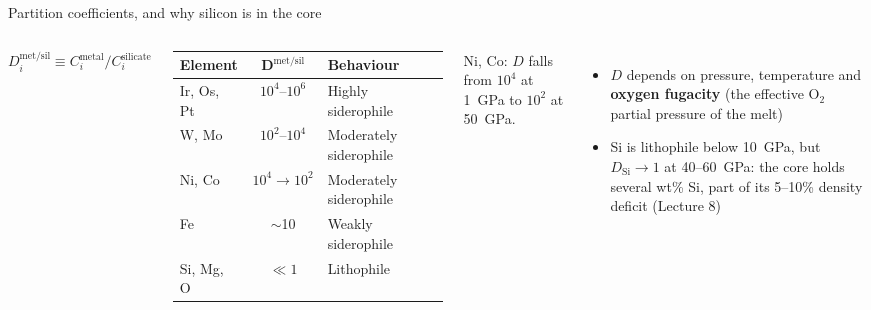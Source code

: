 \documentclass[aspectratio=169, 11pt]{beamer}
\begin{document}
\begin{frame}{Partition coefficients, and why silicon is in the core}
  \begin{columns}[c]
    \centering
    $D_i^{\mathrm{met/sil}} \equiv C_i^{\mathrm{metal}} / C_i^{\mathrm{silicate}}$
    \vskip4pt
    \footnotesize
    \setlength\tabcolsep{2pt}
    \begin{tabular}{l c l}
      \toprule
      \textbf{Element} & $\boldsymbol{D^{\mathrm{met/sil}}}$ & \textbf{Behaviour} \\
      \midrule
      Ir, Os, Pt & $10^4$--$10^6$ & Highly siderophile \\
      W, Mo      & $10^2$--$10^4$ & Moderately siderophile \\
      Ni, Co     & $10^4 \to 10^2$ & Moderately siderophile \\
      Fe         & $\sim$10        & Weakly siderophile \\
      Si, Mg, O  & $\ll 1$         & Lithophile \\
      \bottomrule
    \end{tabular}\par\vskip3pt
    {\tiny Ni, Co: $D$ falls from $10^4$ at 1~GPa to $10^2$ at 50~GPa.\par}
    \small
    \begin{itemize}\setlength\itemsep{4pt}
      \item $D$ depends on pressure, temperature and \textbf{oxygen fugacity} (the effective O$_2$ partial pressure of the melt)
      \item Si is lithophile below 10~GPa, but $D_\mathrm{Si} \to 1$ at 40--60~GPa: the core holds several wt\% Si, part of its 5--10\% density deficit (Lecture 8)
    \end{itemize}
  \end{columns}
  \vskip4pt
  \par\vskip2pt
\end{frame}

\begin{frame}
\end{frame}
\end{document}
